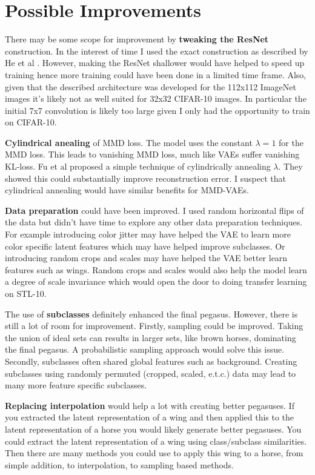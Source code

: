 \documentclass{article}
\begin{document}
\section{Possible Improvements}
There may be some scope for improvement by \textbf{tweaking the ResNet} construction. In the interest of time I used the exact construction as described by He et al \cite{ResNet}. However, making the ResNet shallower would have helped to speed up training hence more training could have been done in a limited time frame. Also, given that the described architecture was developed for the 112x112 ImageNet images it's likely not as well suited for 32x32 CIFAR-10 images. In particular the initial 7x7 convolution is likely too large given I only had the opportunity to train on CIFAR-10.

\textbf{Cylindrical anealing} of MMD loss. The model uses the constant $\lambda=1$ for the MMD loss. This leads to vanishing MMD loss, much like VAEs suffer vanishing KL-loss. Fu et al \cite{cylindricalAnnealing} proposed a simple technique of cylindrically annealing $\lambda$. They showed this could substantially improve reconstruction error. I suspect that cylindrical annealing would have similar benefits for MMD-VAEs.

\textbf{Data preparation} could have been improved. I used random horizontal flips of the data but didn't have time to explore any other data preparation techniques. For example introducing color jitter may have helped the VAE to learn more color specific latent features which may have helped improve subclasses. Or introducing random crops and scales may have helped the VAE better learn features such as wings. Random crops and scales would also help the model learn a degree of scale invariance which would open the door to doing transfer learning on STL-10.  

The use of \textbf{subclasses} definitely enhanced the final pegasus. However, there is still a lot of room for improvement. Firstly, sampling could be improved. Taking the union of ideal sets can results in larger sets, like brown horses, dominating the final pegasus. A probabilistic sampling approach would solve this issue. Secondly, subclasses often shared global features such as background. Creating subclasses using randomly permuted (cropped, scaled, e.t.c.) data may lead to many more feature specific subclasses.

\textbf{Replacing interpolation} would help a lot with creating better pegasuses. If you extracted the latent representation of a wing and then applied this to the latent representation of a horse you would likely generate better pegasuses. You could extract the latent representation of a wing using class/subclass similarities. Then there are many methods you could use to apply this wing to a horse, from simple addition, to interpolation, to sampling based methods.
\end{document}
